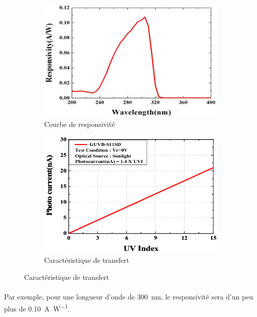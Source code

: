 \documentclass{article}
\begin{document}
    \begin{figure}[H]
        \centering
        \begin{subfigure}[b]{0.418\linewidth}
            \includegraphics[width=\linewidth]{./images/photodiode-UVB-courbe-responsivite.png}
            \caption{Courbe de responsivité}
        \end{subfigure}
        \begin{subfigure}[b]{0.4\linewidth}
            \includegraphics[width=\linewidth]{./images/photodiode-UVB-photocourant-indice-UV.png}
            \caption{Caractéristique de transfert}
        \end{subfigure}
    \end{figure}

    \paragraph{}
    Par exemple, pour une longueur d'onde de \SI{300}{\nano\meter}, le responsivité sera d'un peu plus de \SI{0.10}{\ampere\per\watt}.
\end{document}
